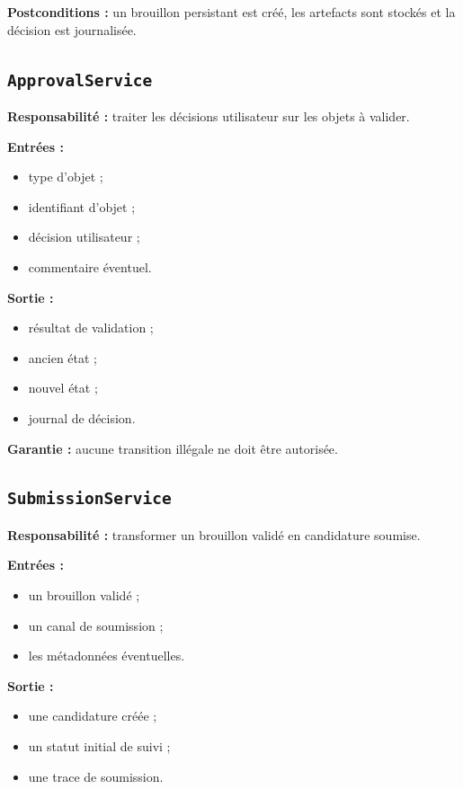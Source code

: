 \documentclass[11pt,a4paper]{article}
\begin{document}
\textbf{Postconditions :}
un brouillon persistant est créé, les artefacts sont stockés et la décision est journalisée.

\subsection{\texttt{ApprovalService}}

\textbf{Responsabilité :} traiter les décisions utilisateur sur les objets à valider.

\textbf{Entrées :}
\begin{itemize}
    \item type d’objet ;
    \item identifiant d’objet ;
    \item décision utilisateur ;
    \item commentaire éventuel.
\end{itemize}

\textbf{Sortie :}
\begin{itemize}
    \item résultat de validation ;
    \item ancien état ;
    \item nouvel état ;
    \item journal de décision.
\end{itemize}

\textbf{Garantie :}
aucune transition illégale ne doit être autorisée.

\subsection{\texttt{SubmissionService}}

\textbf{Responsabilité :} transformer un brouillon validé en candidature soumise.

\textbf{Entrées :}
\begin{itemize}
    \item un brouillon validé ;
    \item un canal de soumission ;
    \item les métadonnées éventuelles.
\end{itemize}

\textbf{Sortie :}
\begin{itemize}
    \item une candidature créée ;
    \item un statut initial de suivi ;
    \item une trace de soumission.
\end{itemize}
\end{document}
